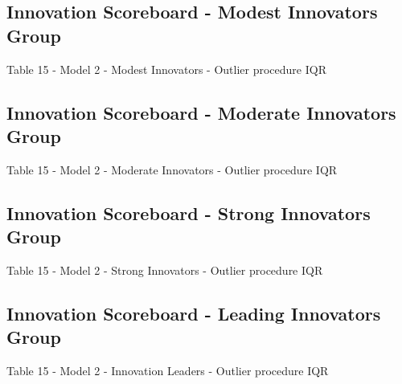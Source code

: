 \documentclass{beamer}					%
\begin{document}
	\subsection{Innovation Scoreboard - Modest Innovators Group}
	
	\begin{frame}{Table 15 - Model 2 - Modest Innovators - Outlier procedure IQR}
		
	\end{frame}

%		

	\subsection{Innovation Scoreboard - Moderate Innovators Group}
	
	\begin{frame}{Table 15 - Model 2 - Moderate Innovators - Outlier procedure IQR}
		
	\end{frame}	

%		

	\subsection{Innovation Scoreboard - Strong Innovators Group}

	\begin{frame}{Table 15 - Model 2 - Strong Innovators - Outlier procedure IQR}
		
	\end{frame}

%		

	\subsection{Innovation Scoreboard - Leading Innovators Group}

	\begin{frame}{Table 15 - Model 2 - Innovation Leaders - Outlier procedure IQR}
		
	\end{frame}
\end{document}

